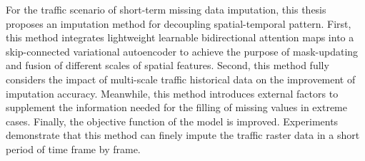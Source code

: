 \begin{eabstract}
For the traffic scenario of short-term missing data imputation, this thesis proposes an imputation method for decoupling spatial-temporal pattern. First, this method integrates lightweight learnable bidirectional attention maps into a skip-connected variational autoencoder to achieve the purpose of mask-updating and fusion of different scales of spatial features. Second, this method fully considers the impact of multi-scale traffic historical data on the improvement of imputation accuracy. Meanwhile, this method introduces external factors to supplement the information needed for the filling of missing values in extreme cases. Finally, the objective function of the model is improved. Experiments demonstrate that this method can finely impute the traffic raster data in a short period of time frame by frame.
\end{eabstract} 
